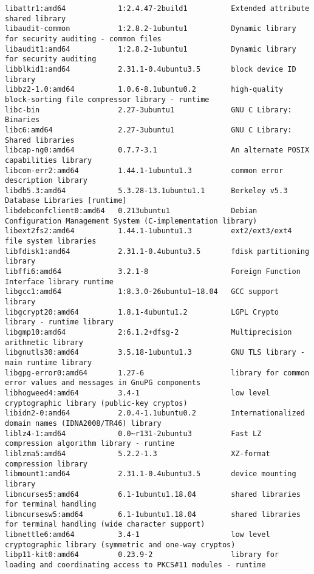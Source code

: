 \begin{tcolorbox}[breakable,colback=yellow!5!black]
\begin{verbatim}
libattr1:amd64            1:2.4.47-2build1          Extended attribute shared library
libaudit-common           1:2.8.2-1ubuntu1          Dynamic library for security auditing - common files
libaudit1:amd64           1:2.8.2-1ubuntu1          Dynamic library for security auditing
libblkid1:amd64           2.31.1-0.4ubuntu3.5       block device ID library
libbz2-1.0:amd64          1.0.6-8.1ubuntu0.2        high-quality block-sorting file compressor library - runtime
libc-bin                  2.27-3ubuntu1             GNU C Library: Binaries
libc6:amd64               2.27-3ubuntu1             GNU C Library: Shared libraries
libcap-ng0:amd64          0.7.7-3.1                 An alternate POSIX capabilities library
libcom-err2:amd64         1.44.1-1ubuntu1.3         common error description library
libdb5.3:amd64            5.3.28-13.1ubuntu1.1      Berkeley v5.3 Database Libraries [runtime]
libdebconfclient0:amd64   0.213ubuntu1              Debian Configuration Management System (C-implementation library)
libext2fs2:amd64          1.44.1-1ubuntu1.3         ext2/ext3/ext4 file system libraries
libfdisk1:amd64           2.31.1-0.4ubuntu3.5       fdisk partitioning library
libffi6:amd64             3.2.1-8                   Foreign Function Interface library runtime
libgcc1:amd64             1:8.3.0-26ubuntu1~18.04   GCC support library
libgcrypt20:amd64         1.8.1-4ubuntu1.2          LGPL Crypto library - runtime library
libgmp10:amd64            2:6.1.2+dfsg-2            Multiprecision arithmetic library
libgnutls30:amd64         3.5.18-1ubuntu1.3         GNU TLS library - main runtime library
libgpg-error0:amd64       1.27-6                    library for common error values and messages in GnuPG components
libhogweed4:amd64         3.4-1                     low level cryptographic library (public-key cryptos)
libidn2-0:amd64           2.0.4-1.1ubuntu0.2        Internationalized domain names (IDNA2008/TR46) library
liblz4-1:amd64            0.0~r131-2ubuntu3         Fast LZ compression algorithm library - runtime
liblzma5:amd64            5.2.2-1.3                 XZ-format compression library
libmount1:amd64           2.31.1-0.4ubuntu3.5       device mounting library
libncurses5:amd64         6.1-1ubuntu1.18.04        shared libraries for terminal handling
libncursesw5:amd64        6.1-1ubuntu1.18.04        shared libraries for terminal handling (wide character support)
libnettle6:amd64          3.4-1                     low level cryptographic library (symmetric and one-way cryptos)
libp11-kit0:amd64         0.23.9-2                  library for loading and coordinating access to PKCS#11 modules - runtime

\end{verbatim}
\end{tcolorbox}
